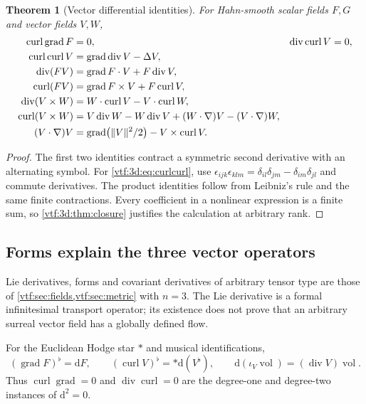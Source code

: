\documentclass[11pt,letterpaper]{article}
\newtheorem{theorem}{Theorem}[section]
\theoremstyle{definition}
\theoremstyle{remark}
\newcommand{\grad}{\operatorname{grad}}\newcommand{\Div}{\operatorname{div}}
\newcommand{\curl}{\operatorname{curl}}
\newcommand{\vol}{\operatorname{vol}}\newcommand{\GL}{\operatorname{GL}}
\newcommand{\dd}{\mathrm d}
\begin{document}
\begin{theorem}[Vector differential identities]\label{vtf:3d:thm:identities}
For Hahn-smooth scalar fields $F,G$ and vector fields $V,W$,
\begin{align}
 \curl\grad F&=0, &\Div\curl V&=0,\\
 \curl\curl V&=\grad\Div V-\Delta V,\label{vtf:3d:eq:curlcurl}\\
 \Div(FV)&=\grad F\cdot V+F\Div V,\\
 \curl(FV)&=\grad F\times V+F\curl V,\\
 \Div(V\times W)&=W\cdot\curl V-V\cdot\curl W,\label{vtf:3d:eq:crossdiv}\\
 \curl(V\times W)&=V\Div W-W\Div V
 +(W\cdot\nabla)V-(V\cdot\nabla)W,\\
 (V\cdot\nabla)V&=\grad\bigl(\norm V^2/2\bigr)-V\times\curl V.
\end{align}
\end{theorem}
\begin{proof}
The first two identities contract a symmetric second derivative with an alternating symbol. For \eqref{vtf:3d:eq:curlcurl}, use
$\epsilon_{ijk}\epsilon_{klm}=\delta_{il}\delta_{jm}-\delta_{im}\delta_{jl}$ and commute derivatives. The product identities follow from Leibniz's rule and the same finite contractions. Every coefficient in a nonlinear expression is a finite sum, so \cref{vtf:3d:thm:closure} justifies the calculation at arbitrary rank.
\end{proof}

\subsection{Forms explain the three vector operators}

Lie derivatives, forms and covariant derivatives of arbitrary tensor type are
those of \cref{vtf:sec:fields,vtf:sec:metric} with $n=3$. The Lie derivative is
a formal infinitesimal transport operator; its existence does not prove that an
arbitrary surreal vector field has a globally defined flow.

For the Euclidean Hodge star $*$ and musical identifications,
\[
 (\grad F)^\flat=\dd F,\qquad
 (\curl V)^\flat=*\dd(V^\flat),\qquad
 \dd(\iota_V\vol)=(\Div V)\vol.
\]
Thus $\curl\grad=0$ and $\Div\curl=0$ are the degree-one and degree-two instances of $\dd^2=0$.
\end{document}
